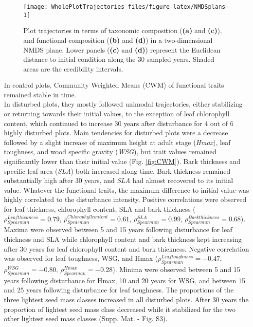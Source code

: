 \documentclass[fleqn,10pt]{ArtEcoFoG} %
\begin{document}
\begin{figure*}

{\centering \texttt{[image: WholePlotTrajectories\_files/figure-latex/NMDSplans-1]} 

}

\caption{Plot trajectories in terms of taxonomic composition (\textbf{(a)} and \textbf{(c)}), and functional composition (\textbf{(b)} and \textbf{(d)}) in a two-dimensional NMDS plane. Lower panels (\textbf{(c)} and \textbf{(d)}) represent the Euclidean distance to initial condition along the 30 sampled years. Shaded areas are the credibility intervals.}\label{fig:NMDSplans}
\end{figure*}

In control plots, Community Weighted Means (CWM) of functional traits remained stable in time.\\
In disturbed plots, they mostly followed unimodal trajectories, either stabilizing or returning towards
their initial values, to the exception of leaf chlorophyll content, which continued to increase 30 years after disturbance for 4 out of 6 highly disturbed plots.
\color{red}Main tendencies for disturbed plots were a decrease followed by a slight increase of maximum height at adult stage (\emph{Hmax}), leaf toughness, and wood specific gravity (\emph{WSG}), but trait values remained significantly lower than their initial value (Fig. \ref{fig:CWM}). \color{black}
Bark thickness and specific leaf area (\emph{SLA}) both increased along time.
Bark thickness remained substantially high after 30 years, and \emph{SLA} had almost recovered to its initial value. Whatever the functional traits, the maximum difference to initial value was highly correlated to the disturbance intensity.
\color{red}Positive correlations were observed for leaf thickness, chlorophyll content, SLA and bark thickness (\(\rho_{Spearman}^{Leaf thickness}=0.79\), \(\rho_{Spearman}^{Chlorophyll content}=0.61\),
\(\rho_{Spearman}^{SLA}=0.99\), \(\rho_{Spearman}^{Bark thickness}=0.68\)).
Maxima were observed between 5 and 15 years following disturbance for leaf thickness and SLA while chlorophyll content and bark thickness kept increasing after 30 years for leaf chlorophyll content and bark thickness.
Negative correlation was observed for leaf toughness, WSG, and Hmax (\(\rho_{Spearman}^{Leaf toughness}=-0.47\),
\(\rho_{Spearman}^{WSG}=-0.80\), \(\rho_{Spearman}^{Hmax}=-0.28\)).
Minima were observed between 5 and 15 years following disturbance for Hmax, 10 and 20 years for WSG, and between 15 and 25 years following disturbance for leaf toughness.\color{black}
The proportions of the three lightest seed mass classes increased in all disturbed plots.
After 30 years the proportion of lightest seed mass class decreased while it stabilized for the two other lightest seed mass classes (Supp. Mat. - Fig. S3).
\end{document}
